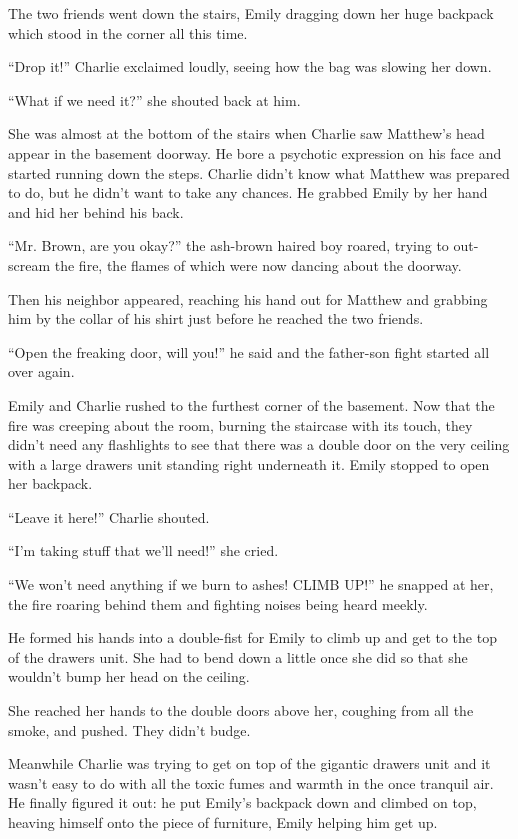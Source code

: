 The two friends went down the stairs, Emily dragging down her huge backpack which stood in the corner all this time.

“Drop it!” Charlie exclaimed loudly, seeing how the bag was slowing her down.

“What if we need it?” she shouted back at him.

She was almost at the bottom of the stairs when Charlie saw Matthew's head appear in the basement doorway. He bore a psychotic expression on his face and started running down the steps. Charlie didn't know what Matthew was prepared to do, but he didn't want to take any chances. He grabbed Emily by her hand and hid her behind his back.

“Mr. Brown, are you okay?” the ash-brown haired boy roared, trying to out-scream the fire, the flames of which were now dancing about the doorway.

Then his neighbor appeared, reaching his hand out for Matthew and grabbing him by the collar of his shirt just before he reached the two friends.

“Open the freaking door, will you!” he said and the father-son fight started all over again.

Emily and Charlie rushed to the furthest corner of the basement. Now that the fire was creeping about the room, burning the staircase with its touch, they didn't need any flashlights to see that there was a double door on the very ceiling with a large drawers unit standing right underneath it. Emily stopped to open her backpack.

“Leave it here!” Charlie shouted.

“I'm taking stuff that we'll need!” she cried.

“We won't need anything if we burn to ashes! CLIMB UP!” he snapped at her, the fire roaring behind them and fighting noises being heard meekly.

He formed his hands into a double-fist for Emily to climb up and get to the top of the drawers unit. She had to bend down a little once she did so that she wouldn't bump her head on the ceiling.

She reached her hands to the double doors above her, coughing from all the smoke, and pushed. They didn't budge. 

Meanwhile Charlie was trying to get on top of the gigantic drawers unit and it wasn't easy to do with all the toxic fumes and warmth in the once tranquil air. He finally figured it out: he put Emily's backpack down and climbed on top, heaving himself onto the piece of furniture, Emily helping him get up.

